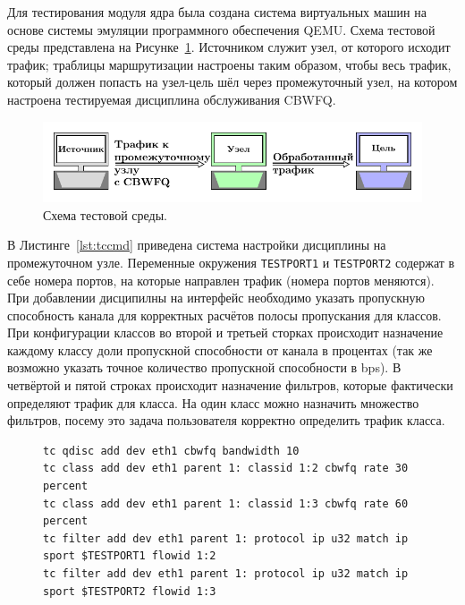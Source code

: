 		Для тестирования модуля ядра была создана система виртуальных машин на основе
		системы эмуляции программного обеспечения QEMU. Схема тестовой среды представлена
		на Рисунке~\ref{pic:testscheme}. Источником служит узел, от которого исходит трафик;
		траблицы маршрутизации настроены таким образом, чтобы весь трафик, который
		должен попасть на узел-цель шёл через промежуточный узел, на котором
		настроена тестируемая дисциплина обслуживания CBWFQ.

        \begin{figure}[ht!]
        	\center
        	\includegraphics[scale=1.2]{pdfimages/test_scheme.pdf}
        	\caption{Схема тестовой среды.}
			\label{pic:testscheme}
        \end{figure}

		В Листинге~\ref{lst:tccmd} приведена система настройки дисциплины на промежуточном узле.
		Переменные окружения \lstinline{TESTPORT1} и \lstinline{TESTPORT2} содержат в себе
		номера портов, на которые направлен трафик (номера портов меняются). При добавлении
		дисципилны на интерфейс необходимо указать пропускную способность канала для
		корректных расчётов полосы пропускания для классов. При конфигурации классов
		во второй и третьей сторках происходит назначение каждому классу доли
		пропускной способности от канала в процентах (так же возможно указать точное
		количество пропускной способности в bps). В четвёртой и пятой строках
		происходит назначение фильтров, которые фактически определяют трафик
		для класса. На один класс можно назначить множество фильтров, посему
		это задача пользователя корректно определить трафик класса. 

        \begin{figure}[ht!]
    		\center
    		\begin{lstlisting}[frame=lines,
    						  caption={Список команд для конфигурации дисциплины обслуживания CBWFQ.},
    						  label={lst:tccmd},
    						  style=tcstyle]
tc qdisc add dev eth1 cbwfq bandwidth 10
tc class add dev eth1 parent 1: classid 1:2 cbwfq rate 30 percent
tc class add dev eth1 parent 1: classid 1:3 cbwfq rate 60 percent 
tc filter add dev eth1 parent 1: protocol ip u32 match ip sport $TESTPORT1 flowid 1:2
tc filter add dev eth1 parent 1: protocol ip u32 match ip sport $TESTPORT2 flowid 1:3
    		\end{lstlisting}
        \end{figure}

